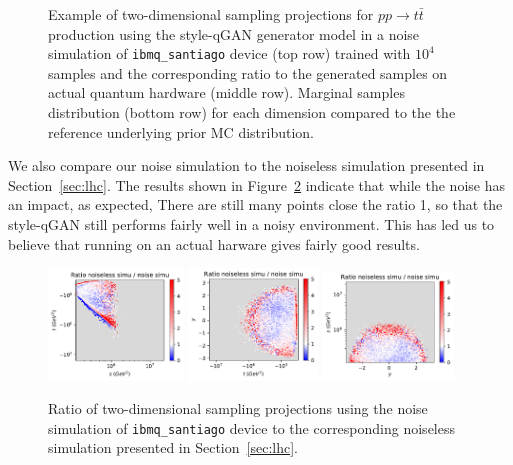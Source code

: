 \documentclass[twocolumn,preprintnumbers,superscriptaddress]{revtex4-2}
\begin{document}
\begin{figure}
  \caption{\label{fig:ibmnoise}Example of two-dimensional sampling projections for
  $pp \rightarrow t\bar{t}$ production using the style-qGAN generator
  model in a noise simulation of {\tt ibmq\_santiago} device (top row) trained
  with $10^4$ samples and the corresponding ratio to the generated samples on actual quantum hardware (middle row).
  Marginal samples distribution (bottom row) for each dimension compared to the the reference underlying prior MC
   distribution.}
\end{figure}

We also compare our noise simulation to the noiseless simulation presented in Section~\ref{sec:lhc}.
The results shown in Figure~\ref{fig:ibmnoise2} indicate that while the noise has an impact, as expected, There are
still many points close the ratio 1, so that the style-qGAN still performs fairly well in a noisy environment. This has led us
to believe that running on an actual harware gives fairly good results.

\begin{figure}

  \includegraphics[width=0.32\textwidth]{plots/hardware_noise_simulation/s-t_RATIO_100k_noiseless-noise.pdf}%
  \includegraphics[width=0.305\textwidth]{plots/hardware_noise_simulation/t-y_RATIO_100k_noiseless-noise.pdf}%
  \includegraphics[width=0.31\textwidth]{plots/hardware_noise_simulation/y-s_RATIO_100k_noiseless-noise.pdf}

  \caption{\label{fig:ibmnoise2}Ratio of two-dimensional sampling projections using the noise simulation of {\tt ibmq\_santiago} device to the
    corresponding noiseless simulation presented in Section~\ref{sec:lhc}.}
\end{figure}

\clearpage


\end{document}

